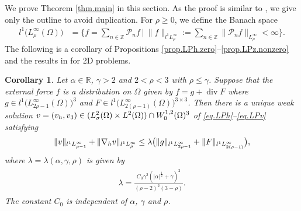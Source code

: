 \documentclass[11pt,a4paper]{article}
\numberwithin{equation}{section}
\newtheorem{corollary}[theorem]{Corollary}
\newcommand{\Z}{\mathbb{Z}}
\newcommand{\R}{\mathbb{R}}
\newcommand{\opdiv}{\operatorname{div}}
\newcommand{\h}{{\rm h}}
\begin{document}
We prove Theorem \ref{thm.main} in this section. As the proof is similar to \cite[Proof of Theorem 1.1]{Higaki2023}, we give only the outline to avoid duplication. For $\rho\ge0$, we define the Banach space
%
\begin{align*}
l^1\big(L^\infty_{\rho}(\Omega)\big)
&= \bigg\{f=\sum_{n\in\Z}\mathcal{P}_n f~\bigg|~ 
\|f\|_{l^1L^\infty_\rho}:=\sum_{n\in\Z} \|\mathcal{P}_n f\|_{L^\infty_\rho}<\infty\bigg\}.
\end{align*}
%
The following is a corollary of Propositions \ref{prop.LPh.zero}--\ref{prop.LPz.nonzero} and the results in \cite{Higaki2023} for 2D problems. 
%
\begin{corollary}\label{cor.est.l1}
Let $\alpha\in\R$, $\gamma>2$ and $2<\rho<3$ with $\rho\le\gamma$. Suppose that the external force $f$ is a distribution on $\Omega$ given by $f = g + \opdiv F$ where $g\in l^1\big(L^\infty_{2\rho-1}(\Omega)\big)^3$ and $F\in l^1\big(L^\infty_{2(\rho-1)}(\Omega)\big)^{3\times3}$. Then there is a unique weak solution $v=(v_\h,v_3)\in (L^2_\sigma(\Omega)\times L^2(\Omega)) \cap W^{1,2}_0(\Omega)^3$ of \eqref{eq.LPh}--\eqref{eq.LPv} satisfying 
%
\begin{align}\label{est1.cor.est.l1}
\begin{split}
\|v\|_{l^1 L^\infty_{\rho-1}} 
+ \|\nabla_\h v\|_{l^1 L^\infty_{\rho}} 
\le 
\lambda 
\big(
\|g\|_{l^1 L^\infty_{2\rho-1}}
+ \|F\|_{l^1 L^\infty_{2(\rho-1)}}
\big), 
\end{split}
\end{align}
%
where $\lambda=\lambda(\alpha,\gamma,\rho)$ is given by 
%
\begin{align*}
\begin{split}
\lambda
= 
\frac{C_0\gamma^2(|\alpha|^\frac12+\gamma)^2}{(\rho-2)^2(3-\rho)}. 
\end{split}
\end{align*}
%
The constant $C_0$ is independent of $\alpha$, $\gamma$ and $\rho$.
\end{corollary}
%
%
\end{document}
